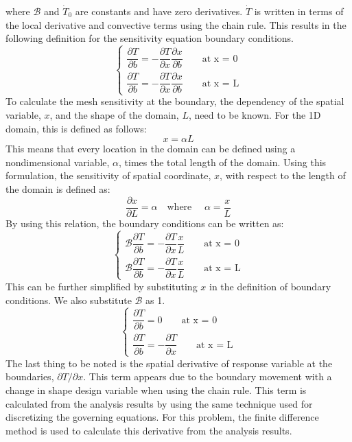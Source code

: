 %
where $\mathcal{B}$ and $\dot{T}_0$ are constants and have zero derivatives. $\dot{T}$ is written in terms of the local derivative and convective terms using the chain rule. This results in the following definition for the sensitivity equation boundary conditions.
%
\begin{equation*}
\begin{cases}
    \dfrac{\partial T}{\partial b} = -\dfrac{\partial T}{\partial x} \dfrac{\partial x}{\partial b} \qquad \text{at x = 0}
    \\
    \dfrac{\partial T}{\partial b} = -\dfrac{\partial T}{\partial x} \dfrac{\partial x}{\partial b} \qquad \text{at x = L}
\end{cases}
\end{equation*}
%
To calculate the mesh sensitivity at the boundary, the dependency of the spatial variable, $x$, and the shape of the domain, $L$, need to be known. For the 1D domain, this is defined as follows:
%
\begin{equation*}
    x = \alpha L
\end{equation*}
%
This means that every location in the domain can be defined using a nondimensional variable, $\alpha$, times the total length of the domain. Using this formulation, the sensitivity of spatial coordinate, $x$, with respect to the length of the domain is defined as:
%
\begin{equation*}
    \frac{\partial x}{\partial L} = \alpha \quad \text{where } \quad \alpha = \frac{x}{L}
\end{equation*}
%
By using this relation, the boundary conditions can be written as:
%
\begin{equation*}
\begin{cases}
    \mathcal{B} \dfrac{\partial T}{\partial b} = -\dfrac{\partial T}{\partial x} \dfrac{x}{L} \qquad \text{at x = 0}
    \\
    \mathcal{B} \dfrac{\partial T}{\partial b} = -\dfrac{\partial T}{\partial x} \dfrac{x}{L} \qquad \text{at x = L}
\end{cases}
\end{equation*}
%
This can be further simplified by substituting $x$ in the definition of boundary conditions. We also substitute $\mathcal{B}$ as 1.
%
\begin{equation}\label{eq:C2_laplaceSAboundaryCondition}
\begin{cases}
    \dfrac{\partial T}{\partial b} = 0 \qquad \text{at x = 0}
    \\
    \dfrac{\partial T}{\partial b} = -\dfrac{\partial T}{\partial x} \qquad \text{at x = L}
\end{cases}
\end{equation}
%
The last thing to be noted is the spatial derivative of response variable at the boundaries, $\partial T/\partial x$. This term appears due to the boundary movement with a change in shape design variable when using the chain rule. This term is calculated from the analysis results by using the same technique used for discretizing the governing equations. For this problem, the finite difference method is used to calculate this derivative from the analysis results.

